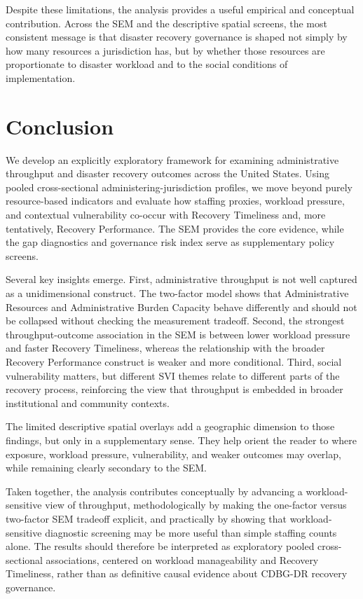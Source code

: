 \documentclass[
  number]{elsarticle}
\begin{document}
Despite these limitations, the analysis provides a useful empirical and
conceptual contribution. Across the SEM and the descriptive spatial
screens, the most consistent message is that disaster recovery
governance is shaped not simply by how many resources a jurisdiction
has, but by whether those resources are proportionate to disaster
workload and to the social conditions of implementation.

\section{Conclusion}\label{conclusion}

We develop an explicitly exploratory framework for examining
administrative throughput and disaster recovery outcomes across the
United States. Using pooled cross-sectional administering-jurisdiction
profiles, we move beyond purely resource-based indicators and evaluate
how staffing proxies, workload pressure, and contextual vulnerability
co-occur with Recovery Timeliness and, more tentatively, Recovery
Performance. The SEM provides the core evidence, while the gap
diagnostics and governance risk index serve as supplementary policy
screens.

Several key insights emerge. First, administrative throughput is not
well captured as a unidimensional construct. The two-factor model shows
that Administrative Resources and Administrative Burden Capacity behave
differently and should not be collapsed without checking the measurement
tradeoff. Second, the strongest throughput-outcome association in the
SEM is between lower workload pressure and faster Recovery Timeliness,
whereas the relationship with the broader Recovery Performance construct
is weaker and more conditional. Third, social vulnerability matters, but
different SVI themes relate to different parts of the recovery process,
reinforcing the view that throughput is embedded in broader
institutional and community contexts.

The limited descriptive spatial overlays add a geographic dimension to
those findings, but only in a supplementary sense. They help orient the
reader to where exposure, workload pressure, vulnerability, and weaker
outcomes may overlap, while remaining clearly secondary to the SEM.

Taken together, the analysis contributes conceptually by advancing a
workload-sensitive view of throughput, methodologically by making the
one-factor versus two-factor SEM tradeoff explicit, and practically by
showing that workload-sensitive diagnostic screening may be more useful
than simple staffing counts alone. The results should therefore be
interpreted as exploratory pooled cross-sectional associations, centered
on workload manageability and Recovery Timeliness, rather than as
definitive causal evidence about CDBG-DR recovery governance.
\end{document}
